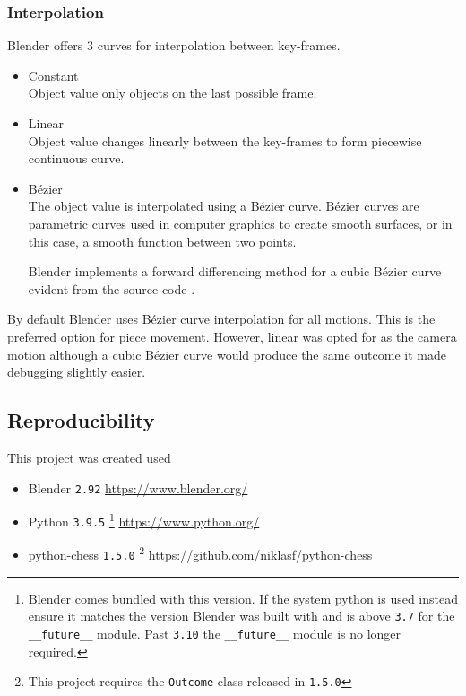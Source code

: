 \documentclass[11pt]{article}
\begin{document}
\subsubsection{Interpolation}
\label{sec:orge070c77}
Blender offers 3 curves for interpolation between key-frames.
\begin{itemize}
\item Constant\\
Object value only objects on the last possible frame.
\item Linear\\
Object value changes linearly between the key-frames to form piecewise
continuous curve.
\item Bézier\\
The object value is interpolated using a Bézier curve. Bézier curves are
parametric curves used in computer graphics to create smooth surfaces, or in
this case, a smooth function between two points.

Blender implements a forward differencing method for a cubic Bézier curve
evident from the source code \cite{blender-source}.
\end{itemize}
By default Blender uses Bézier curve interpolation for all motions. This is the
preferred option for piece movement. However, linear was opted for as the camera
motion although a cubic Bézier curve would produce the same outcome it made
debugging slightly easier.
\subsection{Reproducibility}
\label{sec:org244aad8}
This project was created used
\begin{itemize}
\item Blender \texttt{2.92}
\url{https://www.blender.org/}
\item Python \texttt{3.9.5} \footnote{Blender comes bundled with this version. If the system python is used
instead ensure it matches the version Blender was built with and is above \texttt{3.7}
for the \texttt{\_\_future\_\_} module. Past \texttt{3.10} the \texttt{\_\_future\_\_} module is no longer required.}
\url{https://www.python.org/}
\item python-chess \texttt{1.5.0} \footnote{This project requires the \texttt{Outcome} class released in \texttt{1.5.0}}
\url{https://github.com/niklasf/python-chess}
\end{itemize}
\end{document}
